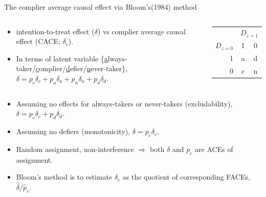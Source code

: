 \begin{frame}{The complier average causal effect via Bloom's(1984) method}

\begin{columns}
  \begin{Column}[.6\linewidth]    
    \begin{itemize}
  \item intention-to-treat effect ($\delta$) vs
    complier average causal effect (CACE; $\delta_{c}$).
 \item In terms of latent variable
   \{\underline{a}lways-taker/\underline{c}omplier/\underline{d}efier/\underline{n}ever-taker\},
   $\delta = p_{c}\delta_{c} + p_{a} \delta_{a} + p_{n} \delta_{n}
   + p_{d} \delta_{d}$.
    \end{itemize}
  \end{Column}
  \begin{Column}[.4\linewidth]
    \begin{tabular}{|r|c|c|}  \hline
      & \multicolumn{2}{c|}{$D_{z=1}$}\\
      $D_{z=0}$ & \multicolumn{1}{c}{1} &  \multicolumn{1}{c|}{0}\\ \hline
      1                &  a   &  d \\
      0                 & c   &  n \\ \hline
    \end{tabular}
  \end{Column}
\end{columns}
\vfill \pause

  \begin{itemize}[<+->]
  \item Assuming no effects for always-takers or never-takers
    (excludability), $\delta = p_{c} \delta_{c} + p_{d} \delta_{d} $.
  \item Assuming no defiers (monotonicity), $\delta = p_{c}
    \delta_{c}$. 
  \item Random assignment, non-interference $\Rightarrow$ both
    $\delta$ and $p_{c}$ are ACEs of assignment.
    \item Bloom's method is to estimate $\delta_{c}$ as the quotient
      of corresponding FACEs, $\hat\delta/\hat{p}_{c}$.
 \end{itemize}

\end{frame}

